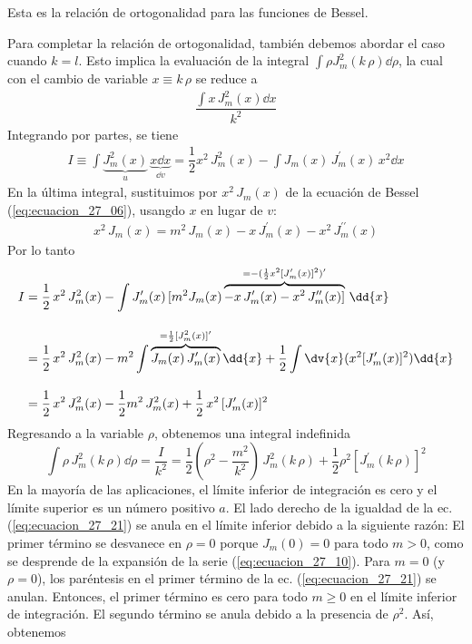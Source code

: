 Esta es la relación de ortogonalidad para las funciones de Bessel.
\par
Para completar la relación de ortogonalidad, también debemos abordar el caso cuando $k = l$. Esto implica la evaluación de la integral $\displaystyle \int \rho J_{m}^{2} ( k \, \rho) \dd{\rho}$, la cual con el cambio de variable $x \equiv k \, \rho$ se reduce a
\begin{align*}
\dfrac{\displaystyle \int x \, J_{m}^{2} (x) \dd{x}}{k^{2}}
\end{align*}
Integrando por partes, se tiene
\begin{align*}
I \equiv \int  \underbrace{J_{m}^{2} (x)}_{u} \, \underbrace{x \dd{x}}_{\dd{v}} =  \dfrac{1}{2} x^{2} \, J_{m}^{2} (x)
 - \int J_{m}(x) \, J_{m}^{\prime} (x) \, x^{2} \dd{x}
\end{align*}
En la última integral, sustituimos por $x^{2} \, J_{m} (x)$ de la ecuación de Bessel (\ref{eq:ecuacion_27_06}), usangdo $x$ en lugar de $v$:
\begin{align*}
x^{2} \, J_{m} (x) =  m^{2} \, J_{m}(x) - x \, J_{m}^{\prime} (x) - x^{2} \, J_{m}^{\prime \prime} (x)
\end{align*}
Por lo tanto
\begin{align*}
I &= \dfrac{1}{2} \, x^{2} \, J_{m}^{2} (x) - \int J_{m}^{\prime}(x) \, [m^{2} J_{m}(x) \overbrace{- x \, J_{m}^{\prime} (x) - x^{2} \, J_{m}^{\prime \prime} (x)]}^{=-(\frac{1}{2} x^{2} [J_{m}^{\prime} (x)]^{2})^{\prime}} \, \dd{x} \\[1em]
&= \dfrac{1}{2} \, x^{2} \, J_{m}^{2} (x) - m^{2} \int \overbrace{J_{m} (x) \, J_{m}^{\prime} (x)}^{=\frac{1}{2} [J_{m}^{2}(x)]^{\prime}} \dd{x} + \dfrac{1}{2} \int \dv{x} (x^{2} [J_{m}^{\prime} (x)]^{2}) \dd{x} \\[1em]
&= \dfrac{1}{2} \, x^{2} \, J_{m}^{2} (x) - \dfrac{1}{2} m^{2} \, J_{m}^{2} (x) + \dfrac{1}{2} \, x^{2} \, [J_{m}^{\prime}(x)]^{2}
\end{align*}
Regresando a la variable $\rho$, obtenemos una integral indefinida
\begin{equation}
\int \rho \, J_{m}^{2} ( k \, \rho) \dd{\rho} = \dfrac{I}{k^{2}} = \dfrac{1}{2} \left(\rho^{2} - \dfrac{m^{2}}{k^{2}} \right) \, J_{m}^{2} (k \, \rho) + \dfrac{1}{2} \rho^{2} [J_{m}^{\prime}(k \, \rho)]^{2}
\label{eq:ecuacion_27_21}
\end{equation}
En la mayoría de las aplicaciones, el límite inferior de integración es cero y el límite superior es un número positivo $a$. El lado derecho de la igualdad de la ec. (\ref{eq:ecuacion_27_21}) se anula en el límite inferior debido a la siguiente razón: El primer término se desvanece en $\rho = 0$ porque $J_{m} (0) = 0$ para todo $m > 0$, como se desprende de la expansión de la serie (\ref{eq:ecuacion_27_10}). Para $m = 0$ (y $\rho = 0$), los paréntesis en el primer término de la ec. (\ref{eq:ecuacion_27_21}) se anulan. Entonces, el primer término es cero para todo $m \geq 0$ en el límite inferior de integración. El segundo término se anula debido a la presencia de $\rho^{2}$. Así, obtenemos
